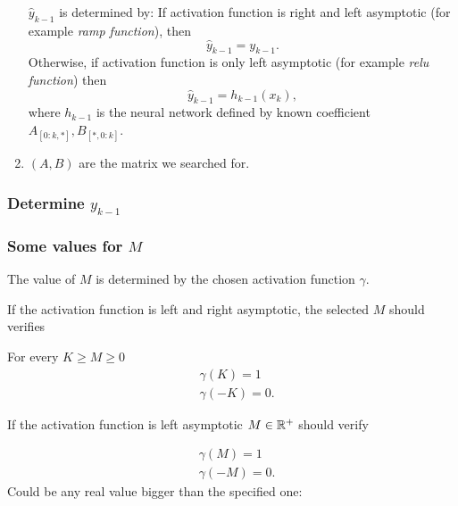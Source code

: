 \begin{enumerate}
     $\hat y_{k-1}$ is determined by: 
     If activation function is right and left asymptotic (for example \textit{ramp function}), then 
     \begin{equation}
        \hat y_{k-1} = y_{k-1}.
     \end{equation}
      Otherwise, if activation function is only left asymptotic (for example \textit{relu function}) then 
     \begin{equation}
        \hat y_{k-1} = h_{k-1}(x_k),
     \end{equation}
     where $h_{k-1}$ is the neural network defined by known coefficient $A_{[0:k, *]}, B_{[*, 0:k]}$.

     
     \item $(A,B)$ are the matrix we searched for.
    
 \end{enumerate}
 

\subsubsection*{Determine $\hat y_{k-1}$}
\subsubsection*{Some values for $M$}
\label{subsec:values of M}
The value of $M$ is determined by the chosen activation function $\gamma$. 

If the activation function is left and right asymptotic, the selected $M$ should verifies 

For every  $K \geq M \geq 0$
\begin{align}
    & \gamma(K) = 1  \\
    & \gamma(-K) = 0. 
\end{align}

If the activation function is left asymptotic $M \in \mathbb{R}^+$ should verify 

\begin{align}
    & \gamma(M) = 1  \\
    & \gamma(-M) = 0. 
\end{align}
Could be any real value bigger than the specified one: 

